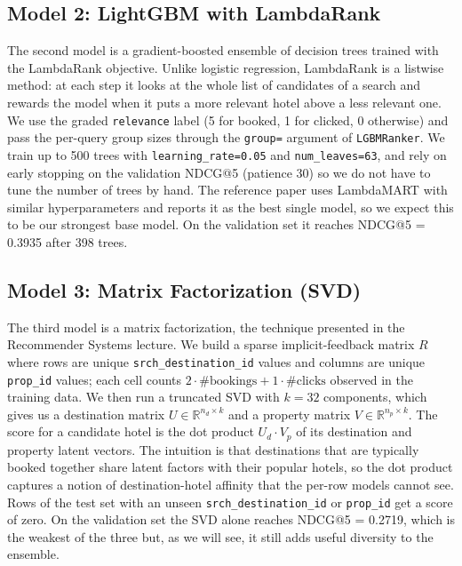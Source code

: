 \documentclass[runningheads]{llncs}
\begin{document}
\subsection{Model 2: LightGBM with LambdaRank}
The second model is a gradient-boosted ensemble of decision trees trained with the LambdaRank objective. Unlike logistic regression, LambdaRank is a listwise method: at each step it looks at the whole list of candidates of a search and rewards the model when it puts a more relevant hotel above a less relevant one. We use the graded \texttt{relevance} label (5 for booked, 1 for clicked, 0 otherwise) and pass the per-query group sizes through the \texttt{group=} argument of \texttt{LGBMRanker}. We train up to 500 trees with \texttt{learning\_rate=0.05} and \texttt{num\_leaves=63}, and rely on early stopping on the validation NDCG@5 (patience 30) so we do not have to tune the number of trees by hand. The reference paper uses LambdaMART with similar hyperparameters and reports it as the best single model, so we expect this to be our strongest base model. On the validation set it reaches NDCG@5 = 0.3935 after 398 trees.

\subsection{Model 3: Matrix Factorization (SVD)}
The third model is a matrix factorization, the technique presented in the Recommender Systems lecture. We build a sparse implicit-feedback matrix $R$ where rows are unique \texttt{srch\_destination\_id} values and columns are unique \texttt{prop\_id} values; each cell counts $2 \cdot \#\text{bookings} + 1 \cdot \#\text{clicks}$ observed in the training data. We then run a truncated SVD with $k=32$ components, which gives us a destination matrix $U \in \mathbb{R}^{n_d \times k}$ and a property matrix $V \in \mathbb{R}^{n_p \times k}$. The score for a candidate hotel is the dot product $U_d \cdot V_p$ of its destination and property latent vectors. The intuition is that destinations that are typically booked together share latent factors with their popular hotels, so the dot product captures a notion of destination-hotel affinity that the per-row models cannot see. Rows of the test set with an unseen \texttt{srch\_destination\_id} or \texttt{prop\_id} get a score of zero. On the validation set the SVD alone reaches NDCG@5 = 0.2719, which is the weakest of the three but, as we will see, it still adds useful diversity to the ensemble.
\end{document}
